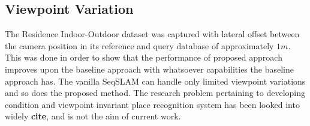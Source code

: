 \documentclass[letterpaper, 10 pt, conference]{ieeeconf}  %
\begin{document}

\subsection{Viewpoint Variation}
The Residence Indoor-Outdoor dataset was captured with lateral offset between the camera position in its reference and query database of approximately $1 m$. This was done in order to show that the performance of proposed approach improves upon the baseline approach with whatsoever capabilities the baseline approach has. The vanilla SeqSLAM can handle only limited viewpoint variations and so does the proposed method. The research problem pertaining to developing condition and viewpoint invariant place recognition system has been looked into widely \textbf{cite}, and is not the aim of current work.
\end{document}
